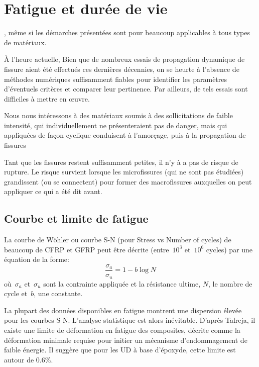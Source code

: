 \medskip
\section{Fatigue et durée de vie}

\medskip
{}, même si les démarches présentées sont pour beaucoup applicables à tous types
de matériaux.

\medskip
À l'heure actuelle,  Bien que de nombreux essais de propagation dynamique de fissure aient été effectués ces dernières décennies, on se heurte à l'absence de méthodes numériques suffisamment fiables pour identifier les paramètres d'éventuels critères et comparer leur pertinence. Par ailleurs, de tels essais sont difficiles à mettre en œuvre.

\medskip
Nous nous intéressons à des matériaux soumis à des sollicitations de faible intensité, qui individuellement ne présenteraient pas de danger, mais qui appliquées de façon cyclique conduisent à l'amorçage, puis à la propagation de fissures

Tant que les fissures restent suffisamment petites, il n'y à a pas de risque de rupture. Le risque survient lorsque les microfissures (qui ne sont pas étudiées) grandissent (ou se connectent) pour former des macrofissures auxquelles on peut appliquer ce qui a été dit avant.

\medskip
\subsection{Courbe et limite de fatigue}

La courbe de Wöhler ou courbe S-N (pour Stress vs Number of cycles) de beaucoup de CFRP et
GFRP peut être décrite (entre~$10^3$ et~$10^6$ cycles) par une équation de la forme: \begin{equation}  \dfrac{\sigma_a}{\sigma_u}=1-b\log N \end{equation} 
où~$\sigma_a$ et~$\sigma_u$ sont la contrainte appliquée et la résistance ultime, $N$, le nombre de cycle et~$b$, une constante.

\medskip
La plupart des données disponibles en fatigue montrent une dispersion élevée pour les courbes S-N. L'analyse statistique est alors inévitable.
\medskipvm
D'après Talreja, il existe une limite de déformation en fatigue des composites, décrite comme la déformation minimale requise pour initier un mécanisme d'endommagement de faible énergie. Il suggère que pour les UD à base d'époxyde, cette limite est autour de 0.6\%.


